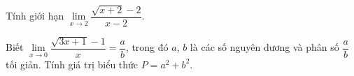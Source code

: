 \begin{ex}%
	Tính giới hạn  $\lim\limits_{x\to 2}\dfrac{\sqrt{x+2}-2}{x-2}$.
\end{ex}

\begin{ex}%
	Biết $ \lim\limits_{x\to  0}\dfrac{\sqrt{3x+1}-1}{x}=\dfrac{a}{b}$, trong đó $a$, $b$ là các số nguyên dương và phân số $\dfrac{a}{b}$ tối giản. Tính giá trị biểu thức $P=a^2+b^2$.
\end{ex}

